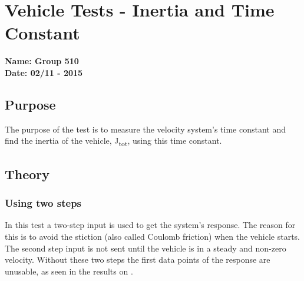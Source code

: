 \pagebreak
\section{Vehicle Tests - Inertia and Time Constant} \label{app:inertiaTest}
\textbf{Name: Group 510}\\
\textbf{Date: 02/11 - 2015}

\subsection{Purpose}
The purpose of the test is to measure the velocity system's time constant and find the inertia of the vehicle, \si{J_{tot}}, using this time constant.
\subsection{Theory}



\subsubsection{Using two steps}
In this test a two-step input is used to get the system's response. The reason for this is to avoid the stiction (also called Coulomb friction) when the vehicle starts. The second step input is not sent until the vehicle is in a steady and non-zero velocity. Without these two steps the first data points of the response are unusable, as seen in the results on .

